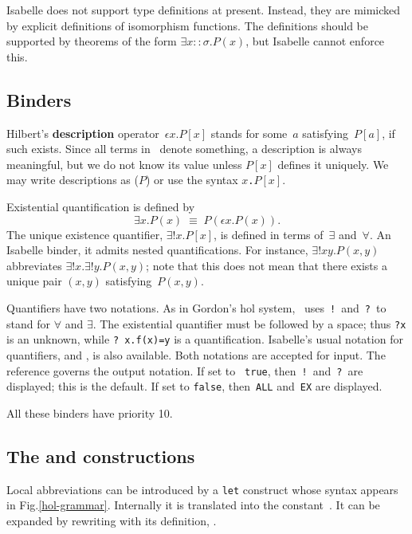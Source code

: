 Isabelle does not support type definitions at present.  Instead, they are
mimicked by explicit definitions of isomorphism functions.  The definitions
should be supported by theorems of the form $\exists x::\sigma.P(x)$, but
Isabelle cannot enforce this.


\subsection{Binders}
Hilbert's {\bf description} operator~$\epsilon x.P[x]$ stands for some~$a$
satisfying~$P[a]$, if such exists.  Since all terms in \HOL\ denote
something, a description is always meaningful, but we do not know its value
unless $P[x]$ defines it uniquely.  We may write descriptions as
($P$) or use the syntax
\hbox{\tt \at $x$.$P[x]$}.

Existential quantification is defined by
\[ \exists x.P(x) \;\equiv\; P(\epsilon x.P(x)). \]
The unique existence quantifier, $\exists!x.P[x]$, is defined in terms
of~$\exists$ and~$\forall$.  An Isabelle binder, it admits nested
quantifications.  For instance, $\exists!x y.P(x,y)$ abbreviates
$\exists!x. \exists!y.P(x,y)$; note that this does not mean that there
exists a unique pair $(x,y)$ satisfying~$P(x,y)$.

Quantifiers have two notations.  As in Gordon's {\sc hol} system, \HOL\
uses~{\tt!}\ and~{\tt?}\ to stand for $\forall$ and $\exists$.  The
existential quantifier must be followed by a space; thus {\tt?x} is an
unknown, while \verb'? x.f(x)=y' is a quantification.  Isabelle's usual
notation for quantifiers, \sdx{ALL} and \sdx{EX}, is also
available.  Both notations are accepted for input.  The {\ML} reference
\ttindexbold{HOL_quantifiers} governs the output notation.  If set to {\tt
true}, then~{\tt!}\ and~{\tt?}\ are displayed; this is the default.  If set
to {\tt false}, then~{\tt ALL} and~{\tt EX} are displayed.

All these binders have priority 10. 


\subsection{The  and  constructions}
Local abbreviations can be introduced by a {\tt let} construct whose
syntax appears in Fig.\ts\ref{hol-grammar}.  Internally it is translated into
the constant~\cdx{Let}.  It can be expanded by rewriting with its
definition, \tdx{Let_def}.

